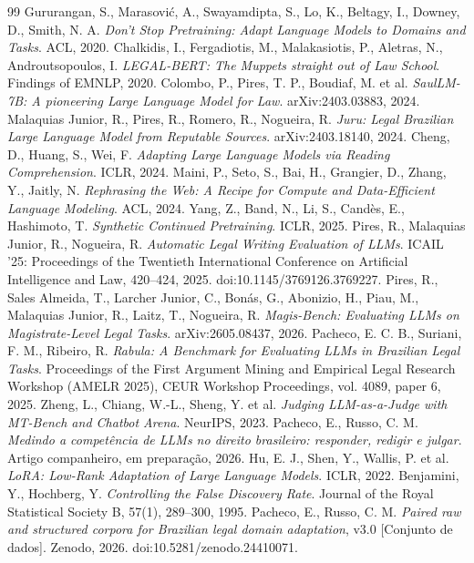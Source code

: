\documentclass{IOS-Book-Article}
\begin{document}
\begin{thebibliography}{99}
 Gururangan, S., Marasović, A., Swayamdipta, S., Lo, K., Beltagy, I., Downey, D., Smith, N. A. \emph{Don't Stop Pretraining: Adapt Language Models to Domains and Tasks}. ACL, 2020.
 Chalkidis, I., Fergadiotis, M., Malakasiotis, P., Aletras, N., Androutsopoulos, I. \emph{LEGAL-BERT: The Muppets straight out of Law School}. Findings of EMNLP, 2020.
 Colombo, P., Pires, T. P., Boudiaf, M. et al. \emph{SaulLM-7B: A pioneering Large Language Model for Law}. arXiv:2403.03883, 2024.
 Malaquias Junior, R., Pires, R., Romero, R., Nogueira, R. \emph{Juru: Legal Brazilian Large Language Model from Reputable Sources}. arXiv:2403.18140, 2024.
 Cheng, D., Huang, S., Wei, F. \emph{Adapting Large Language Models via Reading Comprehension}. ICLR, 2024.
 Maini, P., Seto, S., Bai, H., Grangier, D., Zhang, Y., Jaitly, N. \emph{Rephrasing the Web: A Recipe for Compute and Data-Efficient Language Modeling}. ACL, 2024.
 Yang, Z., Band, N., Li, S., Candès, E., Hashimoto, T. \emph{Synthetic Continued Pretraining}. ICLR, 2025.
 Pires, R., Malaquias Junior, R., Nogueira, R. \emph{Automatic Legal Writing Evaluation of LLMs}. ICAIL '25: Proceedings of the Twentieth International Conference on Artificial Intelligence and Law, 420--424, 2025. doi:10.1145/3769126.3769227.
 Pires, R., Sales Almeida, T., Larcher Junior, C., Bonás, G., Abonizio, H., Piau, M., Malaquias Junior, R., Laitz, T., Nogueira, R. \emph{Magis-Bench: Evaluating LLMs on Magistrate-Level Legal Tasks}. arXiv:2605.08437, 2026.
 Pacheco, E. C. B., Suriani, F. M., Ribeiro, R. \emph{Rabula: A Benchmark for Evaluating LLMs in Brazilian Legal Tasks}. Proceedings of the First Argument Mining and Empirical Legal Research Workshop (AMELR 2025), CEUR Workshop Proceedings, vol. 4089, paper 6, 2025.
 Zheng, L., Chiang, W.-L., Sheng, Y. et al. \emph{Judging LLM-as-a-Judge with MT-Bench and Chatbot Arena}. NeurIPS, 2023.
 Pacheco, E., Russo, C. M. \emph{Medindo a competência de LLMs no direito brasileiro: responder, redigir e julgar}. Artigo companheiro, em preparação, 2026.
 Hu, E. J., Shen, Y., Wallis, P. et al. \emph{LoRA: Low-Rank Adaptation of Large Language Models}. ICLR, 2022.
 Benjamini, Y., Hochberg, Y. \emph{Controlling the False Discovery Rate}. Journal of the Royal Statistical Society B, 57(1), 289--300, 1995.
 Pacheco, E., Russo, C. M. \emph{Paired raw and structured corpora for Brazilian legal domain adaptation}, v3.0 [Conjunto de dados]. Zenodo, 2026. doi:10.5281/zenodo.24410071.

\end{thebibliography}
\end{document}
